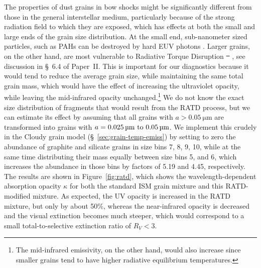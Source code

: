 \documentclass[useAMS, usenatbib, a4paper]{mnras}
\providecommand{\DIFaddtex}[1]{{\protect\color{red!70!black}\uwave{#1}}} %
\providecommand{\DIFdeltex}[1]{{\protect\color{white!50!black} \ifmmode\cancel{#1}\else\sout{#1}\fi}} %
\providecommand{\DIFaddbegin}{} %
\providecommand{\DIFaddend}{} %
\providecommand{\DIFdelbegin}{} %
\providecommand{\DIFdelend}{} %
\providecommand{\DIFadd}[1]{\texorpdfstring{\DIFaddtex{#1}}{#1}} %
\providecommand{\DIFdel}[1]{\texorpdfstring{\DIFdeltex{#1}}{}} %
\begin{document}
The properties of dust grains in bow shocks might be significantly
different from those in the general interstellar medium, particularly
because of the strong radiation field to which they are exposed, which
has effects at both the small and large ends of the grain size
distribution.  At the small end, sub-nanometer sized particles, such
as PAHs can be destroyed by hard EUV photons
\citep{Lebouteiller:2007a, Lebouteiller:2011a}.  Larger grains, on the
other hand, are most vulnerable to Radiative Torque Disruption
\DIFdelbegin \DIFdel{\mbox{%
\citep[RATD;][]{Hoang:2018a}}%
}\DIFdelend \DIFaddbegin \DIFadd{\mbox{%
\citep[RATD;][]{Hoang:2019b}}%
}\DIFaddend , see discussion in \S~6.4 of Paper~II.\@
This is important for our diagnostics because it would tend to reduce
the average grain size, while maintaining the same total grain mass,
which would have the effect of increasing the ultraviolet opacity,
while leaving the mid-infrared opacity unchanged.\footnote{The
  mid-infrared emissivity, on the other hand, would also increase
  since smaller grains tend to have higher radiative equilibrium
  temperatures.} %
We do not know the exact size distribution of fragments that would
result from the RATD process, but we can estimate its effect by
assuming that all grains with \(a > \SI{0.05}{\um}\) are transformed
into grains with \(a = \text{\SIrange{0.025}{0.05}{\um}}\).  We
implement this crudely in the Cloudy grain model
(\S~\ref{sec:grain-temp-emiss}) by setting to zero the abundance of
graphite and silicate grains in size bins 7, 8, 9, 10, while at the
same time distributing their mass equally between size bins 5, and 6,
which increases the abundance in those bins by factors of 5.19 and
4.45, respectively.  The results are shown in Figure~\ref{fig:ratd},
which shows the wavelength-dependent absorption opacity \(\kappa\) for
both the standard ISM grain mixture and this RATD-modified mixture.
As expected, the UV opacity is increased in the RATD mixture, but only
by about 50\%, whereas the near-infrared opacity is decreased and the
visual extinction becomes much steeper, which would correspond to a
small total-to-selective extinction ratio of \(R_V < 3\).
\end{document}
